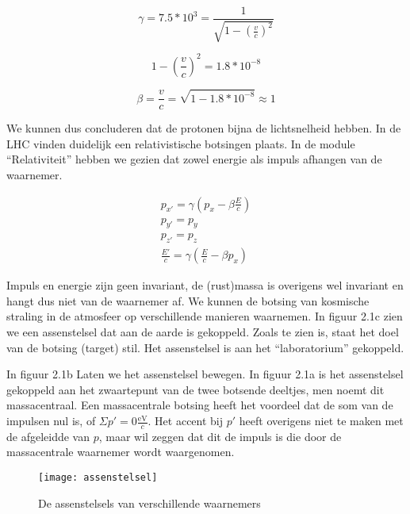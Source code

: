 \begin{equation}
\gamma=7.5*10^{3}=\frac{1}{\sqrt{1-\left(\frac{v}{c}\right)^{2}}}
\end{equation}


\begin{equation}
1-\left(\frac{v}{c}\right)^{2}=1.8*10^{-8}
\end{equation}


\begin{equation}
\beta=\frac{v}{c}=\sqrt{1-1.8*10^{-8}}\approx1
\end{equation}


We kunnen dus concluderen dat de protonen bijna de lichtsnelheid hebben.
In de LHC vinden duidelijk een relativistische botsingen plaats. In
de module ``Relativiteit'' hebben we gezien dat zowel energie als
impuls afhangen van de waarnemer. 

\begin{equation}
\begin{array}{c}
p_{x'}=\gamma\left(p_{x}-\beta\frac{E}{c}\right)\\
p_{y'}=p_{y}\\
p_{z'}=p_{z}\\
\frac{E'}{c}=\gamma\left(\frac{E}{c}-\beta p_{x}\right)
\end{array}
\end{equation}


Impuls en energie zijn geen invariant, de (rust)massa is overigens
wel invariant en hangt dus niet van de waarnemer af. We kunnen de
botsing van kosmische straling in de atmosfeer op verschillende manieren
waarnemen. In figuur 2.1c zien we een assenstelsel dat aan de aarde
is gekoppeld. Zoals te zien is, staat het doel van de botsing (target)
stil. Het assenstelsel is aan het ``laboratorium'' gekoppeld.

In figuur 2.1b Laten we het assenstelsel bewegen. In figuur 2.1a is
het assenstelsel gekoppeld aan het zwaartepunt van de twee botsende
deeltjes, men noemt dit massacentraal. Een massacentrale botsing heeft
het voordeel dat de som van de impulsen nul is, of $\Sigma p'=0\frac{\mathrm{eV}}{c}$.
Het accent bij $p'$ heeft overigens niet te maken met de afgeleidde
van $p$, maar wil zeggen dat dit de impuls is die door de massacentrale
waarnemer wordt waargenomen. 

\begin{figure}[H]
\noindent \begin{centering}
\texttt{[image: assenstelsel]}
\par\end{centering}

\caption{De assenstelsels van verschillende waarnemers}
\end{figure}


